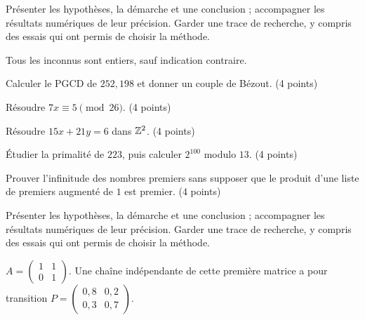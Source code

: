 \vspace{5mm}\noindent Présenter les hypothèses, la démarche et une conclusion ; accompagner les résultats numériques de leur précision. Garder une trace de recherche, y compris des essais qui ont permis de choisir la méthode.\par\vfill{}\par\vspace{2mm}\noindent{}
\label{evaluation-2}
Tous les inconnus sont entiers, sauf indication contraire.
\begin{questions}
\item Calculer le PGCD de $252,198$ et donner un couple de Bézout. \hfill(4 points)
\item Résoudre $7x\equiv5\pmod{26}$. \hfill(4 points)
\item Résoudre $15x+21y=6$ dans $\mathbb{Z}^2$. \hfill(4 points)
\item Étudier la primalité de $223$, puis calculer $2^{100}$ modulo $13$. \hfill(4 points)
\item Prouver l’infinitude des nombres premiers sans supposer que le produit d’une liste de premiers augmenté de $1$ est premier. \hfill(4 points)
\end{questions}
\vspace{5mm}\noindent Présenter les hypothèses, la démarche et une conclusion ; accompagner les résultats numériques de leur précision. Garder une trace de recherche, y compris des essais qui ont permis de choisir la méthode.\par\vfill{}\par\vspace{2mm}\noindent{}
\label{evaluation-3}
$A=\begin{pmatrix}1&1\\0&1\end{pmatrix}$. Une chaîne indépendante de cette première matrice a pour transition $P=\begin{pmatrix}0{,}8&0{,}2\\0{,}3&0{,}7\end{pmatrix}$.
